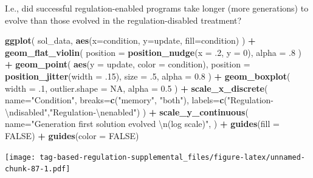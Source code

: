 \documentclass[
]{book}
\newenvironment{Shaded}{\begin{snugshade}}{\end{snugshade}}
\newcommand{\CharTok}[1]{\textcolor[rgb]{0.31,0.60,0.02}{#1}}
\newcommand{\DataTypeTok}[1]{\textcolor[rgb]{0.13,0.29,0.53}{#1}}
\newcommand{\DecValTok}[1]{\textcolor[rgb]{0.00,0.00,0.81}{#1}}
\newcommand{\FloatTok}[1]{\textcolor[rgb]{0.00,0.00,0.81}{#1}}
\newcommand{\KeywordTok}[1]{\textcolor[rgb]{0.13,0.29,0.53}{\textbf{#1}}}
\newcommand{\NormalTok}[1]{#1}
\newcommand{\OperatorTok}[1]{\textcolor[rgb]{0.81,0.36,0.00}{\textbf{#1}}}
\newcommand{\OtherTok}[1]{\textcolor[rgb]{0.56,0.35,0.01}{#1}}
\newcommand{\StringTok}[1]{\textcolor[rgb]{0.31,0.60,0.02}{#1}}
\begin{document}
I.e., did successful regulation-enabled programs take longer (more generations) to evolve than those evolved in the regulation-disabled treatment?

\begin{Shaded}
\begin{Highlighting}[]
\KeywordTok{ggplot}\NormalTok{( sol\_data, }\KeywordTok{aes}\NormalTok{(}\DataTypeTok{x=}\NormalTok{condition, }\DataTypeTok{y=}\NormalTok{update, }\DataTypeTok{fill=}\NormalTok{condition) ) }\OperatorTok{+}
\StringTok{  }\KeywordTok{geom\_flat\_violin}\NormalTok{(}
    \DataTypeTok{position =} \KeywordTok{position\_nudge}\NormalTok{(}\DataTypeTok{x =} \FloatTok{.2}\NormalTok{, }\DataTypeTok{y =} \DecValTok{0}\NormalTok{),}
    \DataTypeTok{alpha =} \FloatTok{.8}
\NormalTok{  ) }\OperatorTok{+}
\StringTok{  }\KeywordTok{geom\_point}\NormalTok{(}
    \KeywordTok{aes}\NormalTok{(}\DataTypeTok{y =}\NormalTok{ update, }\DataTypeTok{color =}\NormalTok{ condition),}
    \DataTypeTok{position =} \KeywordTok{position\_jitter}\NormalTok{(}\DataTypeTok{width =} \FloatTok{.15}\NormalTok{),}
    \DataTypeTok{size =} \FloatTok{.5}\NormalTok{,}
    \DataTypeTok{alpha =} \FloatTok{0.8}
\NormalTok{  ) }\OperatorTok{+}
\StringTok{  }\KeywordTok{geom\_boxplot}\NormalTok{(}
    \DataTypeTok{width =} \FloatTok{.1}\NormalTok{,}
    \DataTypeTok{outlier.shape =} \OtherTok{NA}\NormalTok{,}
    \DataTypeTok{alpha =} \FloatTok{0.5}
\NormalTok{  ) }\OperatorTok{+}
\StringTok{  }\KeywordTok{scale\_x\_discrete}\NormalTok{(}
    \DataTypeTok{name=}\StringTok{"Condition"}\NormalTok{,}
    \DataTypeTok{breaks=}\KeywordTok{c}\NormalTok{(}\StringTok{"memory"}\NormalTok{, }\StringTok{"both"}\NormalTok{),}
    \DataTypeTok{labels=}\KeywordTok{c}\NormalTok{(}\StringTok{"Regulation{-}}\CharTok{\textbackslash{}n}\StringTok{disabled"}\NormalTok{,}\StringTok{"Regulation{-}}\CharTok{\textbackslash{}n}\StringTok{enabled"}\NormalTok{)}
\NormalTok{  ) }\OperatorTok{+}
\StringTok{  }\KeywordTok{scale\_y\_continuous}\NormalTok{(}
    \DataTypeTok{name=}\StringTok{"Generation first solution evolved }\CharTok{\textbackslash{}n}\StringTok{(log scale)"}\NormalTok{,}
\NormalTok{  ) }\OperatorTok{+}
\StringTok{  }\KeywordTok{guides}\NormalTok{(}\DataTypeTok{fill =} \OtherTok{FALSE}\NormalTok{) }\OperatorTok{+}
\StringTok{  }\KeywordTok{guides}\NormalTok{(}\DataTypeTok{color =} \OtherTok{FALSE}\NormalTok{)}
\end{Highlighting}
\end{Shaded}

\texttt{[image: tag-based-regulation-supplemental\_files/figure-latex/unnamed-chunk-87-1.pdf]}
\end{document}
